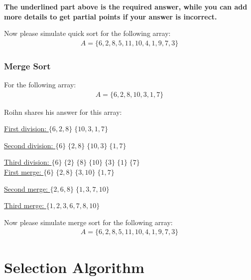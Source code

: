 \documentclass[11pt]{exam}
\begin{document}
\textbf{The underlined part above is the required answer, while you can add more details to get partial points if your answer is incorrect.}

Now please simulate quick sort for the following array:
\begin{align*}
A = \{6, 2, 8, 5, 11, 10, 4, 1, 9, 7, 3\}
\end{align*}

\begin{solution}
\end{solution}

\subsubsection{Merge Sort}
For the following array:
\begin{align*}
A = \{6, 2, 8, 10, 3, 1, 7\}
\end{align*}

Roihn shares his answer for this array:
\begin{solution}

\underline{First division: $\{6,2,8\}\;\{10,3,1,7\}$}

\underline{Second division: $\{6\}\;\{2,8\}\;\{10,3\}\;\{1,7\}$}

\underline{Third division: $\{6\}\;\{2\}\;\{8\}\;\{10\}\;\{3\}\;\{1\}\;\{7\}$}\\

\underline{First merge: $\{6\}\;\{2,8\}\;\{3,10\}\;\{1,7\}$}

\underline{Second merge: $\{2,6,8\}\;\{1,3,7,10\}$}

\underline{Third merge: $\{1,2,3,6,7,8,10\}$}
\end{solution}

Now please simulate merge sort for the following array:
\begin{align*}
A = \{6, 2, 8, 5, 11, 10, 4, 1, 9, 7, 3\}
\end{align*}

\begin{solution}
\end{solution}

\section{Selection Algorithm}
\end{document}
